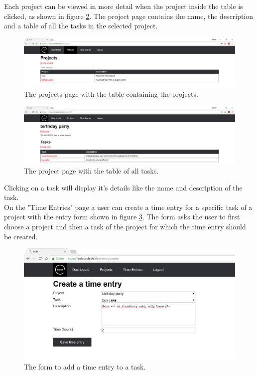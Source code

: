 \documentclass[bibliography=totoc, listof=totocnumbered]{scrartcl}
\begin{document}
Each project can be viewed in more detail when the project inside the table is
clicked, as shown in figure \ref{fig:trckr-project-page}. The project page
contains the name, the description and a table of all the tasks in the selected
project.

\begin{figure}[h]
    \includegraphics[width=\textwidth]{trckr-projects-table}
    \caption{The projects page with the table containing the projects.}
    \label{fig:trckr-projects-table}
\end{figure}

\begin{figure}[h]
    \includegraphics[width=\textwidth]{trckr-project-page}
    \caption{The project page with the table of all tasks.}
    \label{fig:trckr-project-page}
\end{figure}

Clicking on a task will display it's details like the name and description of
the task. \\
On the "Time Entries" page a user can create a time entry for a
specific task of a project with the entry form shown in figure
\ref{fig:trckr-create-time-entry}. The form asks the user to first choose a
project and then a task of the project for which the time entry should be
created.

\begin{figure}[h]
    \includegraphics[width=\textwidth]{trckr-create-time-entry}
    \caption{The form to add a time entry to a task.}
    \label{fig:trckr-create-time-entry}
\end{figure}
\end{document}
